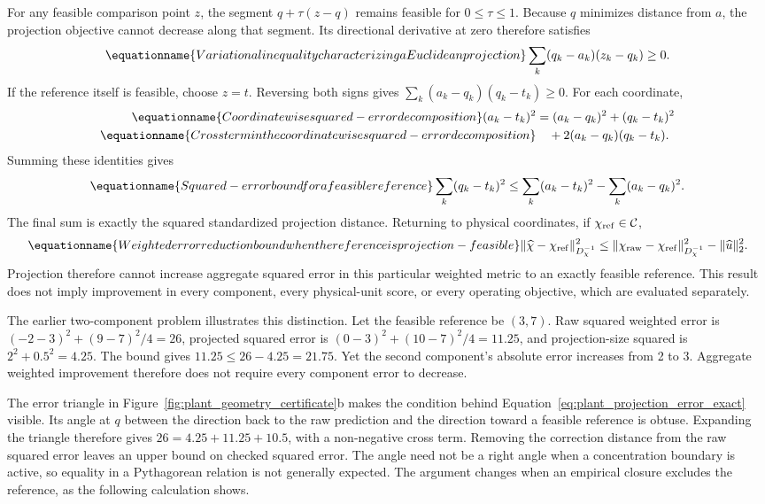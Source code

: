 For any feasible comparison point $z$, the segment $q+\tau(z-q)$ remains feasible for $0\le\tau\le1$. Because $q$ minimizes distance from $a$, the projection objective cannot decrease along that segment. Its directional derivative at zero therefore satisfies
\begin{equation}
\equationname{Variational inequality characterizing a Euclidean projection}
\sum_k(q_k-a_k)(z_k-q_k)\ge0.
\end{equation}
If the reference itself is feasible, choose $z=t$. Reversing both signs gives $\sum_k(a_k-q_k)(q_k-t_k)\ge0$. For each coordinate,
\begin{align}
\equationname{Coordinatewise squared-error decomposition}
(a_k-t_k)^2&=(a_k-q_k)^2+(q_k-t_k)^2\\
\equationname{Cross term in the coordinatewise squared-error decomposition}
&\quad+2(a_k-q_k)(q_k-t_k).
\end{align}
Summing these identities gives
\begin{equation}
\equationname{Squared-error bound for a feasible reference}
\sum_k(q_k-t_k)^2\le\sum_k(a_k-t_k)^2-\sum_k(a_k-q_k)^2.
\end{equation}
The final sum is exactly the squared standardized projection distance. Returning to physical coordinates, if $\chi_{\rm ref}\in\mathcal C$,
\begin{equation}
\equationname{Weighted error reduction bound when the reference is projection-feasible}
\|\widehat\chi-\chi_{\rm ref}\|_{D_\chi^{-1}}^2
\le\|\chi_{\rm raw}-\chi_{\rm ref}\|_{D_\chi^{-1}}^2
-\|\widehat u\|_2^2.
\label{eq:plant_projection_error_exact}
\end{equation}
Projection therefore cannot increase aggregate squared error in this particular weighted metric to an exactly feasible reference. This result does not imply improvement in every component, every physical-unit score, or every operating objective, which are evaluated separately.

The earlier two-component problem illustrates this distinction. Let the feasible reference be $(3,7)$. Raw squared weighted error is $(-2-3)^2+(9-7)^2/4=26$, projected squared error is $(0-3)^2+(10-7)^2/4=11.25$, and projection-size squared is $2^2+0.5^2=4.25$. The bound gives $11.25\le26-4.25=21.75$. Yet the second component's absolute error increases from 2 to 3. Aggregate weighted improvement therefore does not require every component error to decrease.

The error triangle in Figure~\ref{fig:plant_geometry_certificate}b makes the condition behind Equation~\eqref{eq:plant_projection_error_exact} visible. Its angle at $q$ between the direction back to the raw prediction and the direction toward a feasible reference is obtuse. Expanding the triangle therefore gives $26=4.25+11.25+10.5$, with a non-negative cross term. Removing the correction distance from the raw squared error leaves an upper bound on checked squared error. The angle need not be a right angle when a concentration boundary is active, so equality in a Pythagorean relation is not generally expected. The argument changes when an empirical closure excludes the reference, as the following calculation shows.

